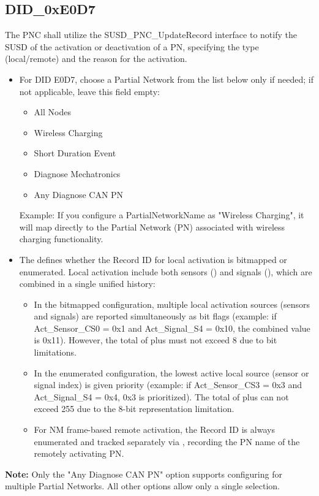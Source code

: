 \subsection{DID\_0xE0D7}
\label{subsection:0xE0D7}
The PNC shall utilize the SUSD\_PNC\_UpdateRecord interface to notify the SUSD of the activation or deactivation of a PN, specifying the type (local/remote) and the reason for the activation.
	
\begin{itemize}
\item For DID E0D7, choose a Partial Network from the list below only if needed; if not applicable, leave this field empty:
	\begin{itemize}
	\item All Nodes
	\item Wireless Charging
	\item Short Duration Event
	\item Diagnose Mechatronics
	\item Any Diagnose CAN PN
	\end{itemize}
    Example: If you configure a PartialNetworkName as "Wireless Charging", it will map directly to the Partial Network (PN) associated with wireless charging functionality.
\item The  defines whether the Record ID for local activation is bitmapped or enumerated. Local activation include both sensors () and signals (), which are combined in a single unified history:
	\begin{itemize}
	\item In the bitmapped configuration, multiple local activation sources (sensors and signals) are reported simultaneously as bit flags
	(example: if Act\_Sensor\_CS0 = 0x1 and Act\_Signal\_S4 = 0x10, the combined value is 0x11).
	However, the total of  plus  must not exceed 8 due to bit limitations.
	\item In the enumerated configuration, the lowest active local source (sensor or signal index) is given priority
	(example: if Act\_Sensor\_CS3 = 0x3 and Act\_Signal\_S4 = 0x4, 0x3 is prioritized).
	The total of  plus  can not exceed 255 due to the 8-bit representation limitation.
	\item For NM frame-based remote activation, the Record ID is always enumerated and tracked separately via , recording the PN name of the remotely activating PN.
	\end{itemize}
\end{itemize}

\textbf{Note:} Only the "Any Diagnose CAN PN" option supports configuring for multiple Partial Networks. All other options allow only a single selection.